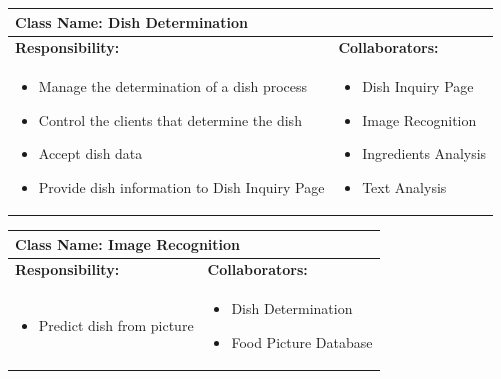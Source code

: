 \documentclass[]{article}
\begin{document}
\begin{table}[H]
	\centering
	\begin{tabular}{|p{7cm}|p{7cm}|}
	\hline 
	 \multicolumn{2}{|l|}{\textbf{Class Name: Dish Determination}} \\
	\hline
	\textbf{Responsibility:} & \textbf{Collaborators:} \\
	\hline
	\raggedright
	\begin{itemize}
		\item Manage the determination of a dish process
		\item Control the clients that determine the dish
		\item Accept dish data
		\item Provide dish information to Dish Inquiry Page
	\end{itemize}
	\vspace{1in} & 
	\begin{itemize}
		\item Dish Inquiry Page
		\item Image Recognition
		\item Ingredients Analysis
		\item Text Analysis
	\end{itemize} \\
	\hline
	\end{tabular}
\end{table}

\begin{table}[H]
	\centering
	\begin{tabular}{|p{7cm}|p{7cm}|}
	\hline 
	 \multicolumn{2}{|l|}{\textbf{Class Name: Image Recognition}} \\
	\hline
	\textbf{Responsibility:} & \textbf{Collaborators:} \\
	\hline
	\raggedright
	\begin{itemize}
		\item Predict dish from picture
	\end{itemize}
	\vspace{1in} & 
	\begin{itemize}
		\item Dish Determination
		\item Food Picture Database
	\end{itemize} \\
	\hline
	\end{tabular}
\end{table}
\end{document}
